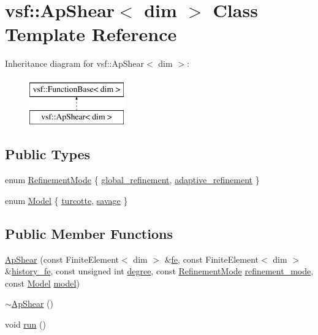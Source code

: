 \hypertarget{classvsf_1_1ApShear}{\section{vsf\-:\-:Ap\-Shear$<$ dim $>$ Class Template Reference}
\label{classvsf_1_1ApShear}
}
Inheritance diagram for vsf\-:\-:Ap\-Shear$<$ dim $>$\-:\begin{figure}[H]
\begin{center}
\leavevmode
\includegraphics[height=2.000000cm]{classvsf_1_1ApShear}
\end{center}
\end{figure}
\subsection*{Public Types}
\begin{DoxyCompactItemize}
\item 
enum \hyperlink{classvsf_1_1ApShear_aef8049bf5f942237a19e8b88ddc19e8c}{Refinement\-Mode} \{ \hyperlink{classvsf_1_1ApShear_aef8049bf5f942237a19e8b88ddc19e8ca4d42958e34994e37831e0e390b554a22}{global\-\_\-refinement}, 
\hyperlink{classvsf_1_1ApShear_aef8049bf5f942237a19e8b88ddc19e8ca6d458d887ac9b2cdfc9bdf078a2d0f78}{adaptive\-\_\-refinement}
 \}
\item 
enum \hyperlink{classvsf_1_1ApShear_a354ce33d5e60761e975bdb924119354d}{Model} \{ \hyperlink{classvsf_1_1ApShear_a354ce33d5e60761e975bdb924119354dab1d7d25f092b95270851c3cf1faa7bb5}{turcotte}, 
\hyperlink{classvsf_1_1ApShear_a354ce33d5e60761e975bdb924119354da218f8a8439447f9d74a62070ad9086dc}{savage}
 \}
\end{DoxyCompactItemize}
\subsection*{Public Member Functions}
\begin{DoxyCompactItemize}
\item 
\hyperlink{classvsf_1_1ApShear_a58df51f254eb8ea07f1523c0d76246fc}{Ap\-Shear} (const Finite\-Element$<$ dim $>$ \&\hyperlink{classvsf_1_1ApShear_a228388a897a688b79d0800f3bb18697f}{fe}, const Finite\-Element$<$ dim $>$ \&\hyperlink{classvsf_1_1ApShear_a3c2f9d0e479ed2ebcb3660a3b7b72aee}{history\-\_\-fe}, const unsigned int \hyperlink{classvsf_1_1ApShear_ae4927f95e4a98c107d743a078a9b1bc8}{degree}, const \hyperlink{classvsf_1_1ApShear_aef8049bf5f942237a19e8b88ddc19e8c}{Refinement\-Mode} \hyperlink{classvsf_1_1ApShear_a523d3e34e242a9dbcf1d727dc17874b6}{refinement\-\_\-mode}, const \hyperlink{classvsf_1_1ApShear_a354ce33d5e60761e975bdb924119354d}{Model} \hyperlink{classvsf_1_1ApShear_a3a6fb4045df9297aea20326cb0df5748}{model})
\item 
\hyperlink{classvsf_1_1ApShear_a7d7cb7564f9d34ccd1a9d4183225cab7}{$\sim$\-Ap\-Shear} ()
\item 
void \hyperlink{classvsf_1_1ApShear_a8c366c00d028013a6949ee94786038ac}{run} ()
\end{DoxyCompactItemize}
